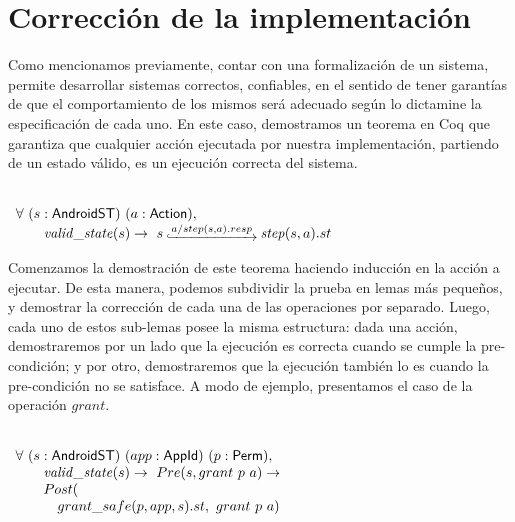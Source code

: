 \section{Corrección de la implementación}
Como mencionamos previamente, contar con una formalización de un sistema, permite desarrollar
sistemas correctos, confiables, en el sentido de tener garantías de que el comportamiento de los
mismos será adecuado según lo dictamine la especificación de cada uno. En este caso, demostramos un
teorema en Coq que garantiza que cualquier acción ejecutada por nuestra implementación, partiendo de
un estado válido, es un ejecución correcta del sistema.


\begin{theorem}
     \label{theorem:soundness}
    \mbox{} \\
    $ \begin{array}[t]{l}
            \forall\ (s:\AndroidState)\ (a:\Action),     \\
            \quad \quad \ap{valid\_state}{s} \rightarrow\
            s\step{a/step(s,a).resp} \bap{step}{s}{a}.st \\
        \end{array} $
\end{theorem}

Comenzamos la demostración de este teorema haciendo inducción en la acción a ejecutar. De esta
manera, podemos subdividir la prueba en lemas más pequeños, y demostrar la corrección de cada una de
las operaciones por separado. Luego, cada uno de estos sub-lemas posee la misma estructura: dada una
acción, demostraremos por un lado que la ejecución es correcta cuando se cumple la pre-condición; y
por otro, demostraremos que la ejecución también lo es cuando la pre-condición no se satisface. A
modo de ejemplo, presentamos el caso de la operación $grant$.

\begin{lemma}
    \mbox{} \\
    $ \begin{array}[t]{l}
            \forall\ (s:\AndroidState)\ (app:\AppId)\ (p:\Perm),                          \\
            \quad \quad \ap{valid\_state}{s} \rightarrow\ Pre(s, grant\ p\ a) \rightarrow \\
            \quad \quad Post(                                                             \\
            \quad \quad \quad grant\_safe(p, app, s).st,\ grant\ p\ a)                    \\
        \end{array} $
\end{lemma}

